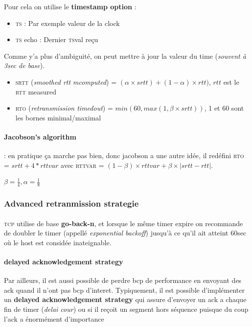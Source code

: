 Pour cela on utilise le \textbf{timestamp option} :
\begin{itemize}
    \item \textsc{ts} : Par exemple valeur de la clock
    \item \textsc{ts} echo : Dernier \textsc{ts}val reçu\\
\end{itemize}


Comme y'a plus d'ambiguité, on peut mettre à jour la valeur du time (\textit{souvent à 3sec
de base}).

\begin{itemize}
    \item \textsc{srtt} (\textit{smoothed rtt mcomputed}) = $ (\alpha \times srtt) + (1-\alpha) \times rtt)$, $rtt$ est le \textsc{rtt} measured
    \item \textsc{rto} (\textit{retransmission timedout}) = $min(60, max(1, \beta \times srtt))$, 1 et 60 sont les bornes minimal/maximal
\end{itemize}

\paragraph{Jacobson's algorithm} : en pratique ça marche pas bien, donc jacobson a une
autre idée, il redéfini \textsc{rto} = $srtt + 4*rttvar$ avec \textsc{rttvar} = $(1-\beta) \times rttvar + \beta \times |srtt - rtt|$.

$\beta = \frac{1}{4}, \alpha = \frac{1}{8}$

\subsubsection{Advanced retranmission strategie}

\paragraph{}
\textsc{tcp} utilise de base \textbf{go-back-n}, et lorsque le même timer
expire on recommande de doubler le timer (appellé \textit{exponential backoff}) jusqu'à
ce qu'il ait atteint 60sec où le host est considée inateignable.

\paragraph{delayed acknowledgement strategy}
Par ailleurs, il est aussi possible de perdre bcp de performance en envoyant des
ack quand il n'ont pas bcp d'interet. Typiquement, il est possible d'implémenter
un \textbf{delayed acknowledgement strategy} qui assure d'envoyer un ack a chaque fin
de timer (\textit{delai cour}) ou si il reçoit un segment hors séquence puisque du coup
l'ack a énormément d'importance

